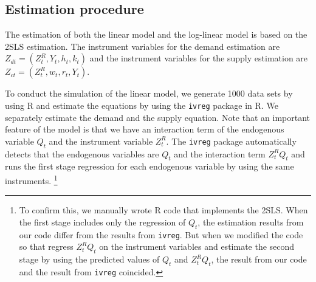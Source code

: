\documentclass[11pt, a4paper]{article}
\begin{document}


\subsection{Estimation procedure}

The estimation of both the linear model and the log-linear model is based on the 2SLS estimation.
The instrument variables for the demand estimation are $Z_{dt} = (Z^R_t, Y_t, h_t, k_t)$ and the instrument variables for the supply estimation are $Z_{ct} = (Z^R_t, w_t, r_t, Y_t)$.

To conduct the simulation of the linear model, we generate 1000 data sets by using R and estimate the equations by using the \texttt{ivreg} package in R.
We separately estimate the demand and the supply equation.
Note that an important feature of the model is that we have an interaction term of the endogenous variable $Q_t$ and the instrument variable $Z^R_t$.
The \texttt{ivreg} package automatically detects that the endogenous variables are $Q_t$ and the interaction term $Z^R_tQ_t$ and runs the first stage regression for each endogenous variable by using the same instruments.
\footnote{To confirm this, we manually wrote R code that implements the 2SLS. 
When the first stage includes only the regression of $Q_t$, the estimation results from our code differ from the results from \texttt{ivreg}. 
But when we modified the code so that regress $Z^R_tQ_t$ on the instrument variables and estimate the second stage by using the predicted values of $Q_t$ and $Z^R_tQ_t$, the result from our code and the result from \texttt{ivreg} coincided.}
\end{document}
